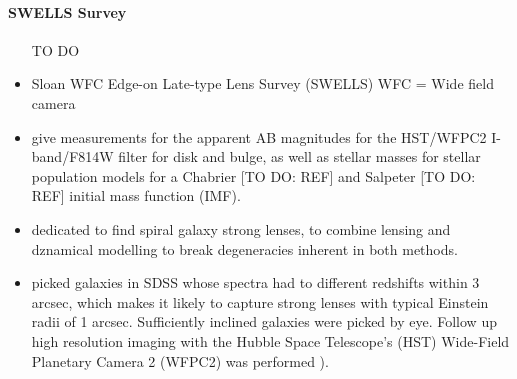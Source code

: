 \paragraph{SWELLS Survey}
\begin{itemize}
\item [TO DO]
\item Sloan WFC Edge-on Late-type Lens Survey (SWELLS) WFC = Wide field camera \citep{SWELLSI,SWELLSII,SWELLSIII,SWELLSIV,SWELLSV,SWELLSVI}
\item \citet{SWELLSI} give measurements for the apparent AB magnitudes for the HST/WFPC2 I-band/F814W filter for disk and bulge, as well as stellar masses for stellar population models for a Chabrier [TO DO: REF] and Salpeter [TO DO: REF] initial mass function (IMF). 
\item dedicated to find spiral galaxy strong lenses, to combine lensing and dznamical modelling to break degeneracies inherent in both methods.
\item picked galaxies in SDSS whose spectra had to different redshifts within 3 arcsec, which makes it likely to capture strong lenses with typical Einstein radii of 1 arcsec. Sufficiently inclined galaxies were picked by eye. Follow up high resolution imaging with the Hubble Space Telescope's (HST) Wide-Field Planetary Camera 2 (WFPC2) was performed \citep{SWELLSI}).
\end{itemize}


